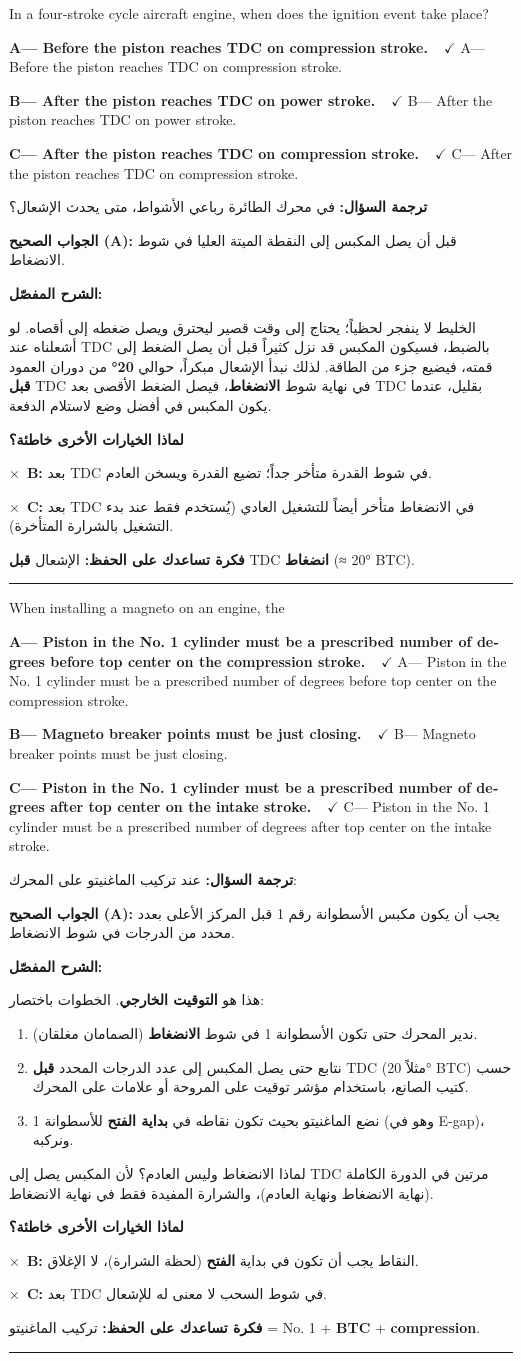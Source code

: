 \documentclass[11pt,a4paper]{article}
\newcommand{\en}[1]{\textenglish{#1}}
\newcommand{\correctletter}{}
\newcommand{\opt}[2]{%
  \ifdefstring{\correctletter}{#1}%
    {\textcolor{ansgreen}{\textbf{#1— #2\ \ $\checkmark$}}}%
    {#1— #2}\par}
\newcommand{\Q}[6]{%
  \renewcommand{\correctletter}{#6}%
  \par\bigskip
  \phantomsection\label{q#1}%
  \begin{tcolorbox}[enhanced,breakable,colback=qback,colframe=qframe,
      arc=2mm,boxrule=0.8pt,fonttitle=\bfseries,
      title={\en{Question #1}}]
    \begin{english}
      #2\par\smallskip
      \opt{A}{#3}\opt{B}{#4}\opt{C}{#5}
    \end{english}
  \end{tcolorbox}}
\newcommand{\tr}[1]{\textbf{\textcolor{qframe}{ترجمة السؤال:}} #1\par}
\newcommand{\ans}[2]{%
  \begin{tcolorbox}[colback=ansback,colframe=ansgreen,boxrule=0.6pt,arc=1.5mm,
      left=4pt,right=4pt,top=2pt,bottom=2pt]
    \textbf{\textcolor{ansgreen}{الجواب الصحيح (\en{#1}):}} #2
  \end{tcolorbox}}
\newcommand{\sharh}[1]{\textbf{\textcolor{conceptc}{الشرح المفصّل:}}\par #1\par}
\newcommand{\nohead}{\textbf{\textcolor{wrongc}{لماذا الخيارات الأخرى خاطئة؟}}\par}
\newcommand{\no}[2]{\hspace*{1em}\textcolor{wrongc}{$\times$}\ \textbf{\en{#1}:} #2\par}
\newcommand{\tip}[1]{%
  \begin{tcolorbox}[colback=tipback,colframe=tipframe,boxrule=0.5pt,arc=1.5mm,
      left=4pt,right=4pt,top=2pt,bottom=2pt]
    \textbf{فكرة تساعدك على الحفظ:} #1
  \end{tcolorbox}}
\newcommand{\qsep}{\par\medskip\noindent\textcolor{qframe!40}{\rule{\linewidth}{0.4pt}}\par}
\begin{document}
\Q{8594}{In a four-stroke cycle aircraft engine, when does the ignition event take place?}
{Before the piston reaches TDC on compression stroke.}
{After the piston reaches TDC on power stroke.}
{After the piston reaches TDC on compression stroke.}{A}
\tr{في محرك الطائرة رباعي الأشواط، متى يحدث الإشعال؟}
\ans{A}{قبل أن يصل المكبس إلى النقطة الميتة العليا في شوط الانضغاط.}
\sharh{الخليط لا ينفجر لحظياً؛ يحتاج إلى وقت قصير ليحترق ويصل ضغطه إلى أقصاه. لو أشعلناه عند \en{TDC} بالضبط، فسيكون المكبس قد نزل كثيراً قبل أن يصل الضغط إلى قمته، فيضيع جزء من الطاقة. لذلك نبدأ الإشعال مبكراً، حوالي \textbf{20°} من دوران العمود \textbf{قبل} \en{TDC} في نهاية شوط \textbf{الانضغاط}، فيصل الضغط الأقصى بعد \en{TDC} بقليل، عندما يكون المكبس في أفضل وضع لاستلام الدفعة.}
\nohead
\no{B}{بعد \en{TDC} في شوط القدرة متأخر جداً؛ تضيع القدرة ويسخن العادم.}
\no{C}{بعد \en{TDC} في الانضغاط متأخر أيضاً للتشغيل العادي (يُستخدم فقط عند بدء التشغيل بالشرارة المتأخرة).}
\tip{الإشعال \textbf{قبل} \en{TDC} \textbf{انضغاط} (≈ 20° \en{BTC}).}
\qsep

\Q{8595}{When installing a magneto on an engine, the}
{Piston in the No. 1 cylinder must be a prescribed number of degrees before top center on the compression stroke.}
{Magneto breaker points must be just closing.}
{Piston in the No. 1 cylinder must be a prescribed number of degrees after top center on the intake stroke.}{A}
\tr{عند تركيب الماغنيتو على المحرك:}
\ans{A}{يجب أن يكون مكبس الأسطوانة رقم 1 قبل المركز الأعلى بعدد محدد من الدرجات في شوط الانضغاط.}
\sharh{هذا هو \textbf{التوقيت الخارجي}. الخطوات باختصار:
\begin{enumerate}[label=\arabic*.]
  \item ندير المحرك حتى تكون الأسطوانة 1 في شوط \textbf{الانضغاط} (الصمامان مغلقان).
  \item نتابع حتى يصل المكبس إلى عدد الدرجات المحدد \textbf{قبل} \en{TDC} (مثلاً 20° \en{BTC}) حسب كتيب الصانع، باستخدام مؤشر توقيت على المروحة أو علامات على المحرك.
  \item نضع الماغنيتو بحيث تكون نقاطه في \textbf{بداية الفتح} للأسطوانة 1 (وهو في \en{E-gap})، ونركبه.
\end{enumerate}
لماذا الانضغاط وليس العادم؟ لأن المكبس يصل إلى \en{TDC} مرتين في الدورة الكاملة (نهاية الانضغاط ونهاية العادم)، والشرارة المفيدة فقط في نهاية الانضغاط.}
\nohead
\no{B}{النقاط يجب أن تكون في بداية \textbf{الفتح} (لحظة الشرارة)، لا الإغلاق.}
\no{C}{بعد \en{TDC} في شوط السحب لا معنى له للإشعال.}
\tip{تركيب الماغنيتو = \en{No. 1} + \en{\textbf{BTC}} + \en{\textbf{compression}}.}
\qsep
\end{document}
